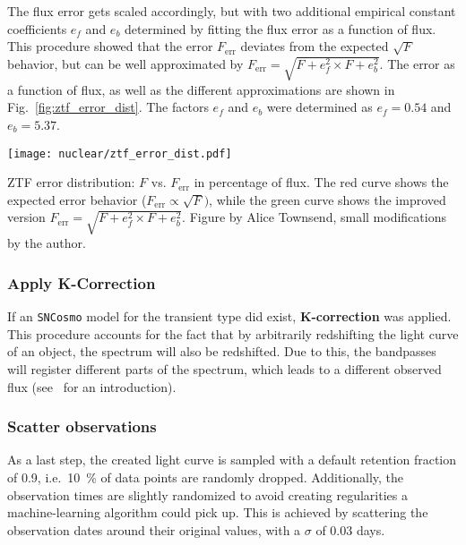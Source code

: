 The flux error gets scaled accordingly, but with two additional empirical constant coefficients $e_f$ and $e_b$ determined by fitting the flux error as a function of flux. This procedure showed that the error $F_\text{err}$ deviates from the expected $\sqrt{F}$ behavior, but can be well approximated by $F_\text{err} = \sqrt{F + e_f^2\times F + e_b^2}$. The error as a function of flux, as well as the different approximations are shown in Fig.~\ref{fig:ztf_error_dist}. The factors $e_f$ and $e_b$ were determined as $e_f = 0.54$ and $e_b = 5.37$.

\begin{marginfigure}
    \texttt{[image: nuclear/ztf\_error\_dist.pdf]}
    \caption[ZTF Error Distribution]{ZTF error distribution: $F$ vs. $F_\text{err}$ in percentage of flux. The red curve shows the expected error behavior ($F_\text{err}\propto \sqrt{F})$, while the green curve shows the improved version $F_\text{err} = \sqrt{F + e_f^2\times F + e_b^2}$. Figure by Alice Townsend, small modifications by the author.}
\end{marginfigure}

\subsubsection{Apply K-Correction}
If an \texttt{SNCosmo} model for the transient type did exist, \textbf{K-correction} was applied. This procedure accounts for the fact that by arbitrarily redshifting the light curve of an object, the spectrum will also be redshifted. Due to this, the bandpasses will register different parts of the spectrum, which leads to a different observed flux (see~ for an introduction).

\subsubsection{Scatter observations}
As a last step, the created light curve is sampled with a default retention fraction of 0.9, i.e.~\SI{10}{\percent} of data points are randomly dropped. Additionally, the observation times are slightly randomized to avoid creating regularities a machine-learning algorithm could pick up. This is achieved by scattering the observation dates around their original values, with a $\sigma$ of $0.03$ days.


